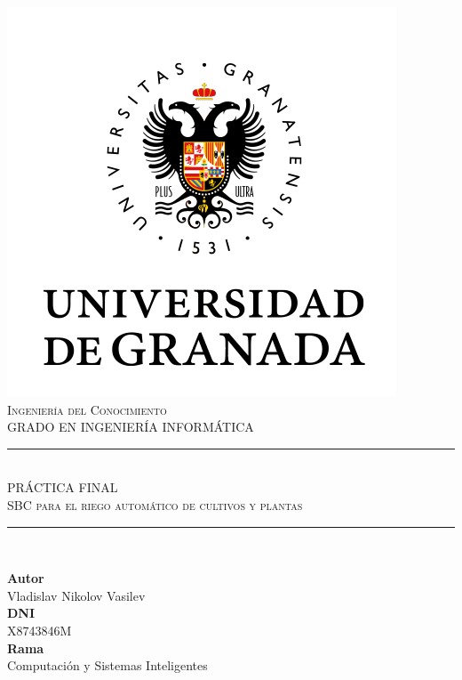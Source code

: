 \documentclass[11pt,a4paper]{article}
\newcommand{\asignatura}{Ingeniería del Conocimiento}
\newcommand{\autor}{Vladislav Nikolov Vasilev}
\begin{document}

\begin{titlepage}

\begin{minipage}{\textwidth}

\centering

\includegraphics[scale=0.5]{img/ugr.png}\\

\textsc{\Large \asignatura{}\\[0.2cm]}
\textsc{GRADO EN INGENIERÍA INFORMÁTICA}\\[1cm]

\noindent\rule[-1ex]{\textwidth}{1pt}\\[1.5ex]
\textsc{{\Huge PRÁCTICA FINAL\\[0.5ex]}}
\textsc{{\Large SBC para el riego automático de cultivos y plantas\\}}
\noindent\rule[-1ex]{\textwidth}{2pt}\\[3.5ex]

\end{minipage}

\vspace{0.5cm}

\begin{minipage}{\textwidth}

\centering

\textbf{Autor}\\ {\autor{}}\\[1ex]
\textbf{DNI}\\ {X8743846M}\\[1ex]
\textbf{Rama}\\ {Computación y Sistemas Inteligentes}\\[1ex]
\vspace{0.2cm}


\end{minipage}
\end{titlepage}
\end{document}
